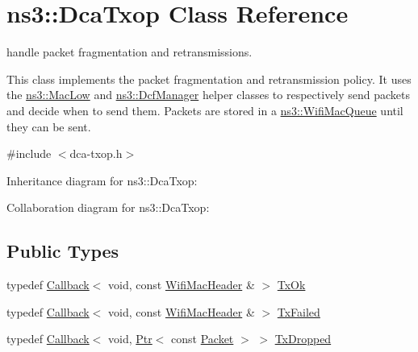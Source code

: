 \hypertarget{classns3_1_1DcaTxop}{}\section{ns3\+:\+:Dca\+Txop Class Reference}
\label{classns3_1_1DcaTxop}


handle packet fragmentation and retransmissions.

This class implements the packet fragmentation and retransmission policy. It uses the \hyperlink{classns3_1_1MacLow}{ns3\+::\+Mac\+Low} and \hyperlink{classns3_1_1DcfManager}{ns3\+::\+Dcf\+Manager} helper classes to respectively send packets and decide when to send them. Packets are stored in a \hyperlink{namespacens3_a3ca96bcdf02c0e7cacea08ca62ead54c}{ns3\+::\+Wifi\+Mac\+Queue} until they can be sent.  




{\ttfamily \#include $<$dca-\/txop.\+h$>$}



Inheritance diagram for ns3\+:\+:Dca\+Txop\+:


Collaboration diagram for ns3\+:\+:Dca\+Txop\+:
\subsection*{Public Types}
\begin{DoxyCompactItemize}
\item 
typedef \hyperlink{classns3_1_1Callback}{Callback}$<$ void, const \hyperlink{classns3_1_1WifiMacHeader}{Wifi\+Mac\+Header} \& $>$ \hyperlink{classns3_1_1DcaTxop_a773f1ef847db20e0618ab9e7378a3023}{Tx\+Ok}
\item 
typedef \hyperlink{classns3_1_1Callback}{Callback}$<$ void, const \hyperlink{classns3_1_1WifiMacHeader}{Wifi\+Mac\+Header} \& $>$ \hyperlink{classns3_1_1DcaTxop_a3ebd4f13afc638a908343e187f9d5514}{Tx\+Failed}
\item 
typedef \hyperlink{classns3_1_1Callback}{Callback}$<$ void, \hyperlink{classns3_1_1Ptr}{Ptr}$<$ const \hyperlink{classns3_1_1Packet}{Packet} $>$ $>$ \hyperlink{classns3_1_1DcaTxop_a38a5d5eb96a8679b8d88d775fddffd86}{Tx\+Dropped}
\end{DoxyCompactItemize}
